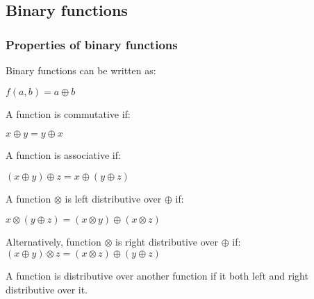 
\subsection{Binary functions}

\subsubsection{Properties of binary functions}

Binary functions can be written as:

$f(a,b)=a\oplus b$

A function is commutative if:

$x\oplus y = y\oplus x$

A function is associative if:

$(x\oplus y)\oplus z = x\oplus (y\oplus z)$

A function \(\otimes \) is left distributive over \(\oplus \) if:

$x\otimes (y\oplus z)=(x\otimes y) \oplus (x\otimes z)$

Alternatively, function \(\otimes \) is right distributive over \(\oplus \) if:
$(x\oplus y)\otimes z=(x\otimes z) \oplus (y\oplus z)$

A function is distributive over another function if it both left and right distributive over it.

